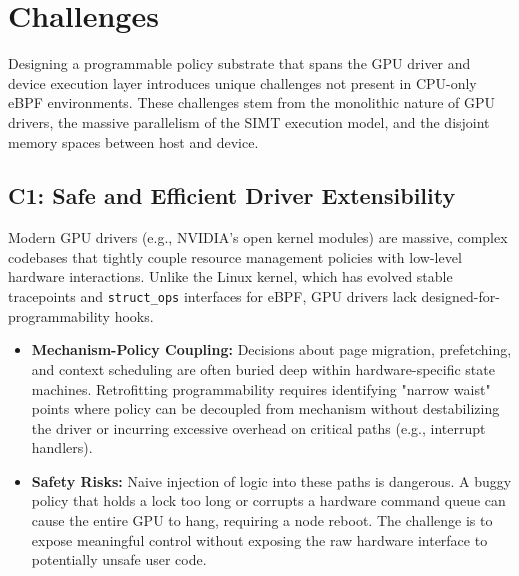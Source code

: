 \section{Challenges}
\label{sec:challenges}

Designing a programmable policy substrate that spans the GPU driver and device execution layer introduces unique challenges not present in CPU-only eBPF environments. These challenges stem from the monolithic nature of GPU drivers, the massive parallelism of the SIMT execution model, and the disjoint memory spaces between host and device.

\subsection{C1: Safe and Efficient Driver Extensibility}
Modern GPU drivers (e.g., NVIDIA's open kernel modules) are massive, complex codebases that tightly couple resource management policies with low-level hardware interactions. Unlike the Linux kernel, which has evolved stable tracepoints and \texttt{struct\_ops} interfaces for eBPF, GPU drivers lack designed-for-programmability hooks.
\begin{itemize}[leftmargin=*]
    \item \textbf{Mechanism-Policy Coupling:} Decisions about page migration, prefetching, and context scheduling are often buried deep within hardware-specific state machines. Retrofitting programmability requires identifying "narrow waist" points where policy can be decoupled from mechanism without destabilizing the driver or incurring excessive overhead on critical paths (e.g., interrupt handlers).
    \item \textbf{Safety Risks:} Naive injection of logic into these paths is dangerous. A buggy policy that holds a lock too long or corrupts a hardware command queue can cause the entire GPU to hang, requiring a node reboot. The challenge is to expose meaningful control without exposing the raw hardware interface to potentially unsafe user code.
\end{itemize}

